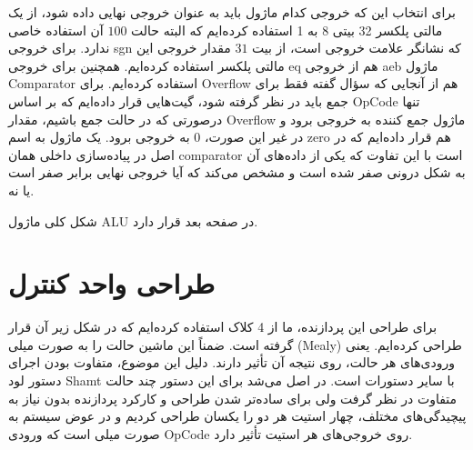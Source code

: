 \documentclass[12pt,titlepage,a4page , tikz , multi,table , svgnames,xcdraw]{article}
\begin{document}
برای انتخاب این که خروجی کدام ماژول باید به عنوان خروجی نهایی داده شود، از یک مالتی پلکسر 32 بیتی 8 به 1 استفاده کرده‌ایم که البته حالت $100$ آن استفاده خاصی ندارد. برای خروجی sgn که نشانگر علامت خروجی است، از بیت $31$ مقدار خروجی این مالتی پلکسر استفاده کرده‌ایم. همچنین برای خروجی eq هم از خروجی aeb ماژول Comparator استفاده کرده‌ایم. برای Overflow هم از آنجایی که سؤال گفته فقط برای جمع باید در نظر گرفته شود، گیت‌هایی قرار داده‌ایم که بر اساس OpCode تنها درصورتی که در حالت جمع باشیم، مقدار Overflow ماژول جمع کننده به خروجی برود و در غیر این صورت، $0$ به خروجی برود. یک ماژول به اسم zero هم قرار داده‌ایم که در اصل در پیاده‌سازی داخلی همان comparator است با این تفاوت که یکی از داده‌های آن به شکل درونی صفر شده است و مشخص می‌کند که آیا خروجی نهایی برابر صفر است یا نه.

شکل کلی ماژول ALU در صفحه بعد قرار دارد.




\begin{landscape}

\thispagestyle{empty}




\end{landscape}




\section{طراحی واحد کنترل}

برای طراحی این پردازنده، ما از 4 کلاک استفاده کرده‌ایم که در شکل زیر  آن قرار گرفته است. ضمناً این ماشین حالت را به صورت میلی (Mealy) طراحی کرده‌ایم. یعنی ورودی‌های هر حالت، روی نتیجه آن تأثیر دارند. دلیل این موضوع، متفاوت بودن اجرای دستور لود Shamt با سایر دستورات است. در اصل می‌شد برای این دستور چند حالت متفاوت در نظر گرفت ولی برای ساده‌تر شدن طراحی و کارکرد پردازنده بدون نیاز به پیچیدگی‌های مختلف، چهار استیت هر دو را یکسان طراحی کردیم و در عوض سیستم به صورت میلی است که ورودی OpCode روی خروجی‌های هر استیت تأثیر دارد.
\end{document}
